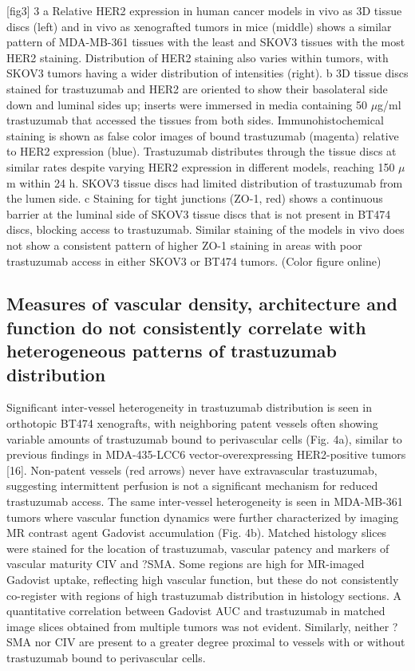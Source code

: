 [fig3]
3
a Relative HER2 expression in human cancer models in vivo as 3D tissue discs (left) and in vivo as xenografted tumors in mice (middle) shows a similar pattern of MDA-MB-361 tissues with the least and SKOV3 tissues with the most HER2 staining.
Distribution of HER2 staining also varies within tumors, with SKOV3 tumors having a wider distribution of intensities (right).
b 3D tissue discs stained for trastuzumab and HER2 are oriented to show their basolateral side down and luminal sides up; inserts were immersed in media containing 50 $\mu$g/ml trastuzumab that accessed the tissues from both sides.
Immunohistochemical staining is shown as false color images of bound trastuzumab (magenta) relative to HER2 expression (blue).
Trastuzumab distributes through the tissue discs at similar rates despite varying HER2 expression in different models, reaching 150 $\mu$m within 24 h.
SKOV3 tissue discs had limited distribution of trastuzumab from the lumen side.
c Staining for tight junctions (ZO-1, red) shows a continuous barrier at the luminal side of SKOV3 tissue discs that is not present in BT474 discs, blocking access to trastuzumab.
Similar staining of the models in vivo does not show a consistent pattern of higher ZO-1 staining in areas with poor trastuzumab access in either SKOV3 or BT474 tumors.
(Color figure online)

\subsection{Measures of vascular density, architecture and function do not consistently correlate with heterogeneous patterns of trastuzumab distribution}

Significant inter-vessel heterogeneity in trastuzumab distribution is seen in orthotopic BT474 xenografts, with neighboring patent vessels often showing variable amounts of trastuzumab bound to perivascular cells (Fig.
4a), similar to previous findings in MDA-435-LCC6 vector-overexpressing HER2-positive tumors [16].
Non-patent vessels (red arrows) never have extravascular trastuzumab, suggesting intermittent perfusion is not a significant mechanism for reduced trastuzumab access.
The same inter-vessel heterogeneity is seen in MDA-MB-361 tumors where vascular function dynamics were further characterized by imaging MR contrast agent Gadovist accumulation (Fig.
4b).
Matched histology slices were stained for the location of trastuzumab, vascular patency and markers of vascular maturity CIV and ?SMA.
Some regions are high for MR-imaged Gadovist uptake, reflecting high vascular function, but these do not consistently co-register with regions of high trastuzumab distribution in histology sections.
A quantitative correlation between Gadovist AUC and trastuzumab in matched image slices obtained from multiple tumors was not evident.
Similarly, neither ?SMA nor CIV are present to a greater degree proximal to vessels with or without trastuzumab bound to perivascular cells.

